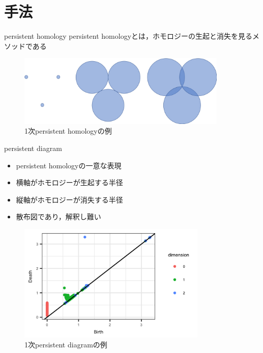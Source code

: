 \documentclass[dvipdfmx,cjk]{beamer}
\theoremstyle{example}
\begin{document}
\section{手法}
\begin{frame}{persistent homology}
persistent homologyとは，ホモロジーの生起と消失を見るメソッドである
\vspace{5mm}
\begin{figure}[H]
\begin{center}
\includegraphics[width=100mm]{fig/persistent_homology.png}
\caption{1次persistent homologyの例}\label{fig:PH}
\end{center}
\end{figure}
\end{frame}


\begin{frame}{persistent diagram}
\begin{itemize}
\item persistent homologyの一意な表現
\item 横軸がホモロジーが生起する半径
\item 縦軸がホモロジーが消失する半径
\item 散布図であり，解釈し難い
\end{itemize}
\begin{figure}[H]
\begin{center}
\includegraphics[width=90mm]{fig/persistent_diagram.png}
\caption{1次persistent diagramの例}\label{fig:PD}
\end{center}
\end{figure}
\end{frame}
\end{document}
